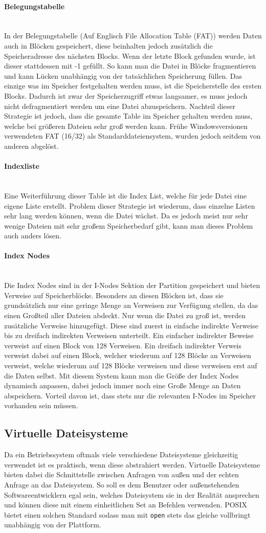 \documentclass{article}
\newcommand{\paragraphlb}[1]{\paragraph{#1}\mbox{}\\}
\begin{document}
	\paragraphlb{Belegungstabelle}
	In der Belegungstabelle (Auf Englisch File Allocation Table (FAT)) werden Daten auch in Blöcken gespeichert, diese beinhalten jedoch zusätzlich die Speicheradresse des nächsten Blocks. Wenn der letzte Block gefunden wurde, ist dieser stattdessen mit -1 gefüllt. So kann man die Datei in Blöcke fragmentieren und kann Lücken unabhängig von der tatsächlichen Speicherung füllen. Das einzige was im Speicher festgehalten werden muss, ist die Speicherstelle des ersten Blocks. Dadurch ist zwar der Speicherzugriff etwas langsamer, es muss jedoch nicht defragmentiert werden um eine Datei abzuspeichern. Nachteil dieser Strategie ist jedoch, dass die gesamte Table im Speicher gehalten werden muss, welche bei größeren Dateien sehr groß werden kann. Frühe Windowsversionen verwendeten FAT (16/32) als Standarddateiensystem, wurden jedoch seitdem von anderen abgelöst. \\
	\paragraphlb{Indexliste}
	Eine Weiterführung dieser Table ist die Index List, welche für jede Datei eine eigene Liste erstellt. Problem dieser Strategie ist wiederum, dass einzelne Listen sehr lang werden können, wenn die Datei wächst. Da es jedoch meist nur sehr wenige Dateien mit sehr großem Speicherbedarf gibt, kann man dieses Problem auch anders lösen.
	\paragraphlb{Index Nodes}
	Die Index Nodes sind in der I-Nodes Sektion der Partition gespeichert und bieten Verweise auf Speicherblöcke. Besonders an diesen Blöcken ist, dass sie grundsätzlich nur eine geringe Menge an Verweisen zur Verfügung stellen, da das einen Großteil aller Dateien abdeckt. Nur wenn die Datei zu groß ist, werden zusätzliche Verweise hinzugefügt. Diese sind zuerst in einfache indirekte Verweise bis zu dreifach indirekten Verweisen unterteilt. Ein einfacher indirekter Beweise verweist auf einen Block von 128 Verweisen. Ein dreifach indirekter Verweis verweist dabei auf einen Block, welcher wiederum auf 128 Blöcke an Verweisen verweist, welche wiederum auf 128 Blöcke verweisen und diese verweisen erst auf die Daten selbst. Mit diesem System kann man die Größe der Index Nodes dynamisch anpassen, dabei jedoch immer noch eine Große Menge an Daten abspeichern. Vorteil davon ist, dass stets nur die relevanten I-Nodes im Speicher vorhanden sein müssen.
	\subsection{Virtuelle Dateisysteme}
	Da ein Betriebssystem oftmals viele verschiedene Dateisysteme gleichzeitig verwendet ist es praktisch, wenn diese abstrahiert werden. Virtuelle Dateisysteme bieten dabei die Schnittstelle zwischen Anfragen von außen und der echten Anfrage an das Dateisystem. So soll es dem Benutzer oder außenstehenden Softwareentwicklern egal sein, welches Dateisystem sie in der Realität ansprechen und können diese mit einem einheitlichen Set an Befehlen verwenden. POSIX bietet einen solchen Standard sodass man mit \verb|open| stets das gleiche vollbringt unabhängig von der Plattform. \\
\end{document}
